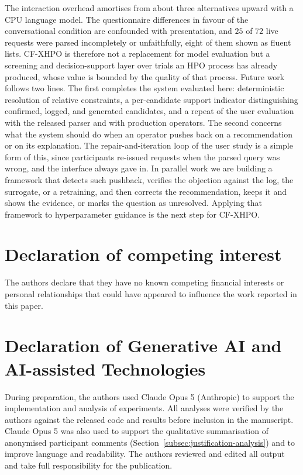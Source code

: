 \documentclass[final,5p,times,twocolumn]{elsarticle}
\begin{document}
The interaction overhead amortises from about three alternatives upward with a CPU language model. The questionnaire differences in favour of the conversational condition are confounded with presentation, and $25$ of $72$ live requests were parsed incompletely or unfaithfully, eight of them shown as fluent lists. CF-XHPO is therefore
not a replacement for model evaluation but a screening and
decision-support layer over trials an HPO process has already produced,
whose value is bounded by the quality of that process. Future work follows two lines. The first completes the system evaluated here: deterministic resolution of relative constraints, a per-candidate support indicator distinguishing confirmed, logged, and generated candidates, and a repeat of the user evaluation with the released parser and with production operators. The second concerns what the system should do when an operator pushes back on a recommendation or on its explanation. The repair-and-iteration loop of the user study is a simple form of this, since participants re-issued requests when the parsed query was wrong, and the interface always gave in. In parallel work we are building a framework that detects such pushback, verifies the objection against the log, the surrogate, or a retraining, and then corrects the recommendation, keeps it and shows the evidence, or marks the question as unresolved. Applying that framework to hyperparameter guidance is the next step for CF-XHPO.

\section*{Declaration of competing interest}
The authors declare that they have no known competing financial
interests or personal relationships that could have appeared to
influence the work reported in this paper.

\section*{Declaration of Generative AI and AI-assisted Technologies}
During preparation, the authors used Claude Opus 5 (Anthropic) to
support the implementation and analysis of experiments. All analyses were verified by the authors against the released code and results
before inclusion in the manuscript. Claude Opus 5 was also used to
support the qualitative summarisation of anonymised participant
comments (Section~\ref{subsec:justification-analysis}) and to improve
language and readability. The authors reviewed and edited all output
and take full responsibility for the publication.
\end{document}
